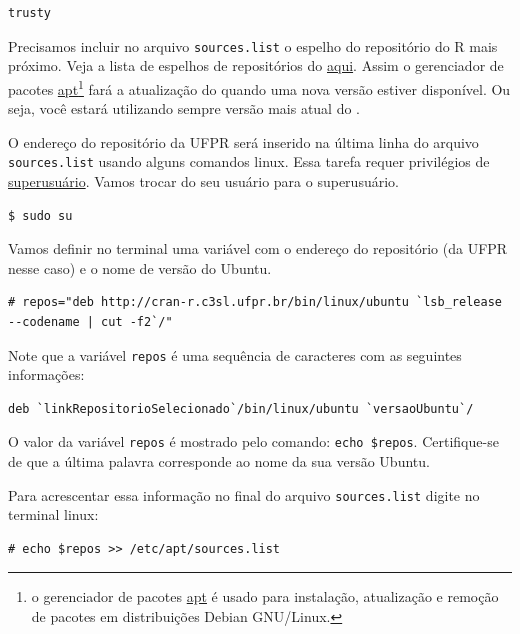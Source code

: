 \documentclass[]{book}
\let\rmarkdownfootnote\footnote%
\def\footnote{\protect\rmarkdownfootnote}
\begin{document}
\begin{verbatim}
trusty
\end{verbatim}

Precisamos incluir no arquivo \texttt{sources.list} o espelho do
repositório do R mais próximo. Veja a lista de espelhos de repositórios
do \href{https://cran.r-project.org/mirrors.html}{aqui}. Assim o
gerenciador de pacotes
\href{http://pt.wikipedia.org/wiki/Advanced_Packaging_Tool}{apt}\footnote{o
  gerenciador de pacotes
  \href{http://pt.wikipedia.org/wiki/Advanced_Packaging_Tool}{apt} é
  usado para instalação, atualização e remoção de pacotes em
  distribuições Debian GNU/Linux.} fará a atualização do quando uma nova
versão estiver disponível. Ou seja, você estará utilizando sempre versão
mais atual do .

O endereço do repositório da UFPR será inserido na última linha do
arquivo \texttt{sources.list} usando alguns comandos linux. Essa tarefa
requer privilégios de
\href{https://pt.wikipedia.org/wiki/Superusu\%C3\%A1rio}{superusuário}.
Vamos trocar do seu usuário para o superusuário.

\begin{verbatim}
$ sudo su
\end{verbatim}

Vamos definir no terminal uma variável com o endereço do repositório (da
UFPR nesse caso) e o nome de versão do Ubuntu.

\begin{verbatim}
# repos="deb http://cran-r.c3sl.ufpr.br/bin/linux/ubuntu `lsb_release --codename | cut -f2`/"
\end{verbatim}

Note que a variável \texttt{repos} é uma sequência de caracteres com as
seguintes informações:

\begin{verbatim}
deb `linkRepositorioSelecionado`/bin/linux/ubuntu `versaoUbuntu`/
\end{verbatim}

O valor da variável \texttt{repos} é mostrado pelo comando:
\texttt{echo\ \$repos}. Certifique-se de que a última palavra
corresponde ao nome da sua versão Ubuntu.

Para acrescentar essa informação no final do arquivo
\texttt{sources.list} digite no terminal linux:

\begin{verbatim}
# echo $repos >> /etc/apt/sources.list
\end{verbatim}
\end{document}
